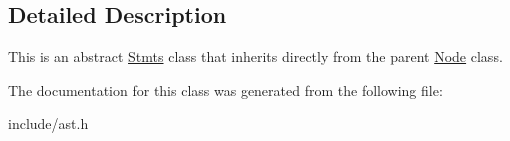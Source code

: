 \subsection{Detailed Description}
This is an abstract \hyperlink{classfcal_1_1ast_1_1Stmts}{Stmts} class that inherits directly from the parent \hyperlink{classfcal_1_1ast_1_1Node}{Node} class. 

The documentation for this class was generated from the following file\+:\begin{DoxyCompactItemize}
\item 
include/ast.\+h\end{DoxyCompactItemize}
